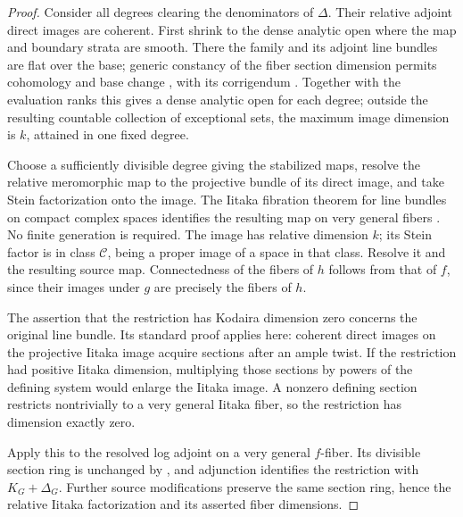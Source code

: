 \begin{proof}
Consider all degrees clearing the denominators of \(\Delta\).
Their relative adjoint direct images are coherent. First shrink to
the dense analytic open where the map and boundary strata are smooth.
There the family and its adjoint line bundles are flat over the base;
generic constancy of the fiber section dimension permits cohomology
and base change \cite[\S7, nos.~4--6, S\"atze~3--5]{GrauertDirectImages},
with its corrigendum \cite{GrauertDirectImagesCorr}.
Together with the evaluation ranks this gives a dense analytic open
for each degree;
outside the resulting countable collection of exceptional sets, the
maximum image dimension is \(k\), attained in one fixed degree.

Choose a sufficiently divisible degree giving the stabilized maps,
resolve the relative meromorphic map to the projective bundle of its
direct image, and take Stein factorization onto the image. The Iitaka
fibration theorem for line bundles on compact complex spaces identifies
the resulting map on very general fibers
\cite[Chapter~II, \S5; Chapter~III, \S7]{UenoClassification}.
No finite generation is required. The image has relative dimension \(k\); its
Stein factor is in class \(\mathcal C\), being a proper image of a space
in that class.  Resolve it and the resulting source map.  Connectedness
of the fibers of \(h\) follows from that of \(f\), since their images
under \(g\) are precisely the fibers of \(h\).

The assertion that the restriction has Kodaira dimension zero concerns
the original line bundle. Its standard proof applies here: coherent
direct images on the projective Iitaka image acquire sections after an
ample twist. If the
restriction had positive Iitaka dimension, multiplying those sections
by powers of the defining system would enlarge the Iitaka image.
A nonzero defining section restricts nontrivially to a very general
Iitaka fiber, so the restriction has dimension exactly zero.

Apply this to the resolved log adjoint on a very general \(f\)-fiber.
Its divisible section ring is unchanged by
, and adjunction identifies the restriction
with \(K_G+\Delta_G\). Further source modifications preserve the same
section ring, hence the relative Iitaka factorization and its asserted
fiber dimensions.
\end{proof}
